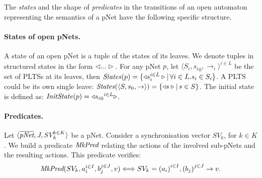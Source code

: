 \documentclass[smallcondensed]{svjour3}
\newcommand{\MkPred}{\symb{MkPred}}
\begin{document}
The \emph{states} and the shape of \emph{predicates} in the
transitions
of an open automaton representing the semantics of a pNet
have the following specific structure.

\paragraph{States of open pNets.}\label{def-states}
A state of an open pNet is a tuple of the
states of its leaves. We denote tuples
in structured states in the form $\triangleleft\ldots\triangleright$.
For any pNet $p$, let $\langle S_i,{s_i}_0, \to_i\rangle^{i \in L}$ be the set of PLTSs at its leaves,
then $\mathit{States}(p) = \{\triangleleft{s_i^{i\in L}}\triangleright
|\, \forall i\in L. s_i \in S_i\}$.
A PLTS could be its own single leave:
$\mathit{States}(\langle S,s_0, \to\rangle) = \{\triangleleft{s}\triangleright|\, s \in S\}$.
The initial state is defined as:
$\mathit{InitState}(p) = \triangleleft{{{s_i}_0}^{i\in L}}\triangleright$.



\paragraph{Predicates.}
Let
$\langle\overline{\pNet},J,\symb{SV}_k^{k\in K} \rangle$
be a pNet. Consider a synchronisation vector $SV_k$, for $k\in K$. We build a
predicate $\MkPred$ relating
the actions of the involved sub-pNets and the resulting actions. This predicate verifies:
$$\MkPred(SV_k, a_i^{i\in I}, b_j^{j\in J}, v)\Longleftrightarrow SV_k={(a_i)}^{i\in I}, {(b_j)}^{j\in J}\rightarrow v.$$



\end{document}
